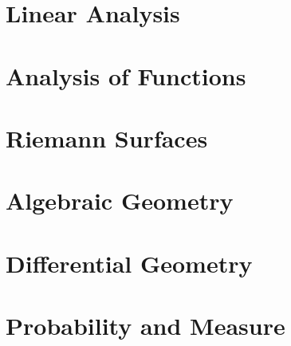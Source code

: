 \documentclass[12pt]{book}
\theoremstyle{definition}
\theoremstyle{remark}
\begin{document}
	\chapter{Linear Analysis}
	
	\chapter{Analysis of Functions}
	
	\chapter{Riemann Surfaces}
	
	\chapter{Algebraic Geometry}
	
	\chapter{Differential Geometry}
	
	\chapter{Probability and Measure}
	
	\backmatter
		\printindex
\end{document}
